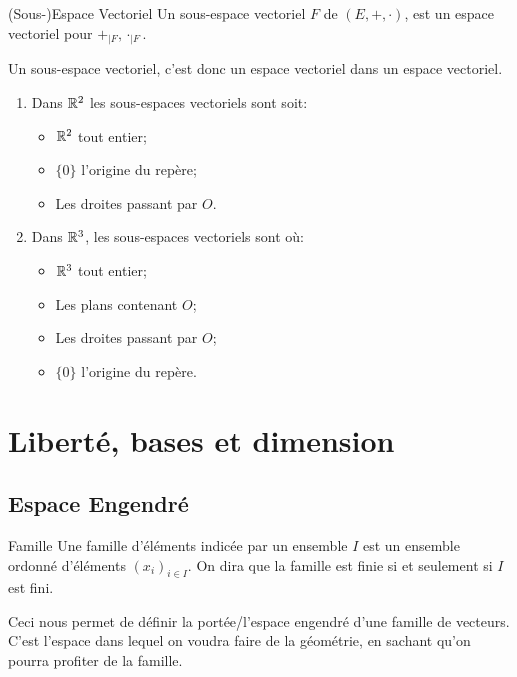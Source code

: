 \documentclass{classe}
\begin{document}
\begin{propositionfr}{(Sous-)Espace Vectoriel}{}
	Un sous-espace vectoriel $F$ de $\left( E, +, \cdot \right)$, est un espace vectoriel pour $+_{\mid F}, \cdot_{\mid F}$.
\end{propositionfr}

Un sous-espace vectoriel, c'est donc un espace vectoriel dans un espace vectoriel.

\begin{example}
	\begin{enumerate}
		\item Dans $\mathbb{R}^{2}$ les sous-espaces vectoriels sont soit:
			\begin{itemize}
				\item $\mathbb{R}^{2}$ tout entier;
				\item $\{0\}$ l'origine du repère;
				\item Les droites passant par $O$.
			\end{itemize}
		\item Dans $\mathbb{R}^{3}$, les sous-espaces vectoriels sont où:
			\begin{itemize}
				\item $\mathbb{R}^{3}$ tout entier;
				\item Les plans contenant $O$;
				\item Les droites passant par $O$;
				\item $\{0\}$ l'origine du repère.
			\end{itemize}
	\end{enumerate}
\end{example}

\section{Liberté, bases et dimension}
\subsection{Espace Engendré}
\begin{définition}{Famille}{}
	Une famille d'éléments indicée par un ensemble $I$ est un ensemble ordonné d'éléments $\left( x_{i} \right)_{i \in I}$.
	On dira que la famille est finie si et seulement si $I$ est fini.
\end{définition}

Ceci nous permet de définir la portée/l'espace engendré d'une famille de vecteurs. C'est l'espace dans lequel on voudra faire de la géométrie, en sachant qu'on pourra profiter de la famille.
\end{document}

